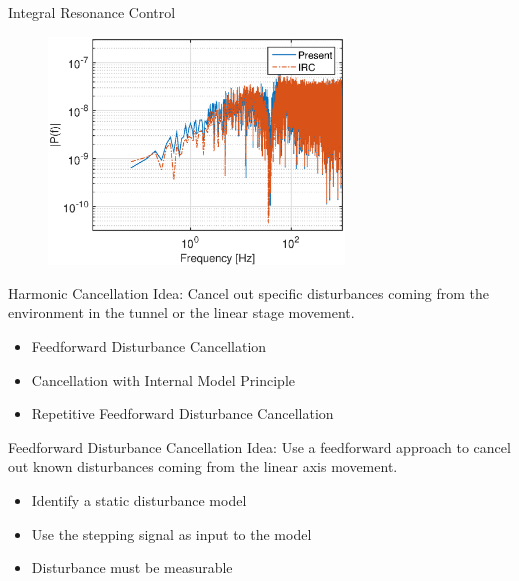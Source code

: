\documentclass[10pt]{beamer}
\begin{document}
\begin{frame}{Integral Resonance Control}
  \begin{figure}[h!]
    \centering
    \includegraphics[width=0.7\textwidth]{../fig/matlab/whitenoiseoutput.eps}
  \end{figure}
\end{frame}

\begin{frame}{Harmonic Cancellation}
  \alert{Idea}: Cancel out specific disturbances coming from the environment in the tunnel or the linear stage movement.
  \begin{itemize}
    \item Feedforward Disturbance Cancellation
    \item Cancellation with Internal Model Principle
    \item Repetitive Feedforward Disturbance Cancellation
  \end{itemize}
\end{frame}

\begin{frame}{Feedforward Disturbance Cancellation}
  \alert{Idea}: Use a feedforward approach to cancel out known disturbances coming from the linear axis movement.
  \begin{itemize}
    \item Identify a static disturbance model
    \item Use the stepping signal as input to the model
    \item Disturbance must be measurable
  \end{itemize}
\end{frame}
\end{document}
